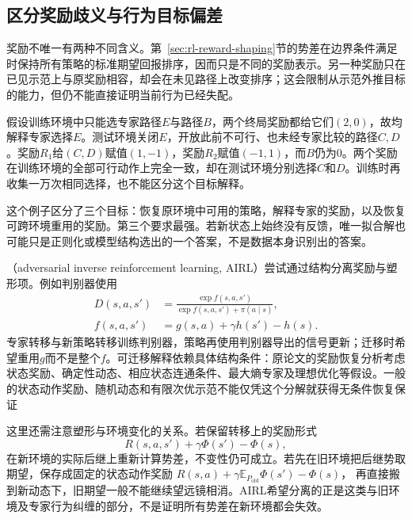 \subsection{区分奖励歧义与行为目标偏差}
\label{sec:rl-reward-ambiguity}

奖励不唯一有两种不同含义。第~\ref{sec:rl-reward-shaping}节的势差在边界条件满足时保持所有策略的标准期望回报排序，因而只是不同的奖励表示。另一种奖励只在已见示范上与原奖励相容，却会在未见路径上改变排序；这会限制从示范外推目标的能力，但仍不能直接证明当前行为已经失配。

\begin{example}[示范相容不等于新路径等价]
  \label{ex:rl-reward-ambiguity}
  假设训练环境中只能选专家路径$E$与路径$B$，两个终局奖励都给它们$(2,0)$，故均解释专家选择$E$。测试环境关闭$E$，开放此前不可行、也未经专家比较的路径$C,D$。奖励$R_1$给$(C,D)$赋值$(1,-1)$，奖励$R_2$赋值$(-1,1)$，而$B$仍为0。两个奖励在训练环境的全部可行动作上完全一致，却在测试环境分别选择$C$和$D$。训练时再收集一万次相同选择，也不能区分这个目标解释。
\end{example}

这个例子区分了三个目标：恢复原环境中可用的策略，解释专家的奖励，以及恢复可跨环境重用的奖励。第三个要求最强。若新状态上始终没有反馈，唯一拟合解也可能只是正则化或模型结构选出的一个答案，不是数据本身识别出的答案。

（adversarial inverse reinforcement learning, AIRL）尝试通过结构分离奖励与塑形项。例如判别器使用
\begin{equation}
  \begin{aligned}
    D(s,a,s')&=\frac{\exp f(s,a,s')}
                         {\exp f(s,a,s')+\pi(a\mid s)},\\
    f(s,a,s')&=g(s,a)+\gamma h(s')-h(s).
  \end{aligned}
  \label{eq:rl-reward-airl}
\end{equation}
专家转移与新策略转移训练判别器，策略再使用判别器导出的信号更新；迁移时希望重用$g$而不是整个$f$。可迁移解释依赖具体结构条件：原论文的奖励恢复分析考虑状态奖励、确定性动态、相应状态连通条件、最大熵专家及理想优化等假设。一般的状态动作奖励、随机动态和有限次优示范不能仅凭这个分解就获得无条件恢复保证

这里还需注意塑形与环境变化的关系。若保留转移上的奖励形式
\[
  R(s,a,s')+\gamma\Phi(s')-\Phi(s),
\]
在新环境的实际后继上重新计算势差，不变性仍可成立。若先在旧环境把后继势取期望，保存成固定的状态动作奖励
$R(s,a)+\gamma\mathbb E_{P_{\mathrm{old}}}\Phi(s')-\Phi(s)$，
再直接搬到新动态下，旧期望一般不能继续望远镜相消。AIRL希望分离的正是这类与旧环境及专家行为纠缠的部分，不是证明所有势差在新环境都会失效。

